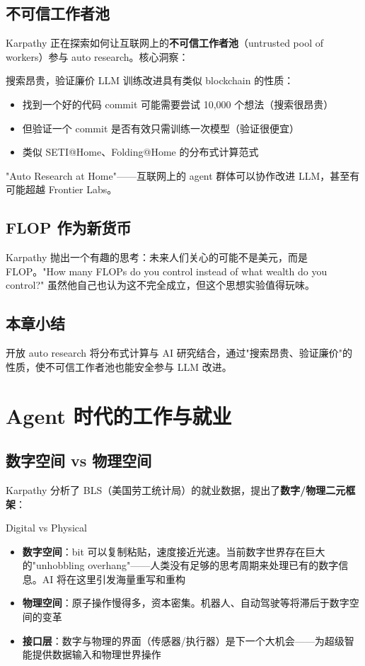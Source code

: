 \documentclass[a4paper]{article}
\begin{document}
\subsection{不可信工作者池}

Karpathy 正在探索如何让互联网上的\textbf{不可信工作者池}（untrusted pool of workers）参与 auto research。核心洞察：

\begin{importantbox}{搜索昂贵，验证廉价}
LLM 训练改进具有类似 blockchain 的性质：
\begin{itemize}
    \item 找到一个好的代码 commit 可能需要尝试 10,000 个想法（搜索很昂贵）
    \item 但验证一个 commit 是否有效只需训练一次模型（验证很便宜）
    \item 类似 SETI@Home、Folding@Home 的分布式计算范式
\end{itemize}
"Auto Research at Home"——互联网上的 agent 群体可以协作改进 LLM，甚至有可能超越 Frontier Labs。
\end{importantbox}

\subsection{FLOP 作为新货币}

Karpathy 抛出一个有趣的思考：未来人们关心的可能不是美元，而是 FLOP。"How many FLOPs do you control instead of what wealth do you control?" 虽然他自己也认为这不完全成立，但这个思想实验值得玩味。

\subsection{本章小结}

开放 auto research 将分布式计算与 AI 研究结合，通过"搜索昂贵、验证廉价"的性质，使不可信工作者池也能安全参与 LLM 改进。


\section{Agent 时代的工作与就业}

\subsection{数字空间 vs 物理空间}

Karpathy 分析了 BLS（美国劳工统计局）的就业数据，提出了\textbf{数字/物理二元框架}：

\begin{importantbox}{Digital vs Physical}
\begin{itemize}
    \item \textbf{数字空间}：bit 可以复制粘贴，速度接近光速。当前数字世界存在巨大的"unhobbling overhang"——人类没有足够的思考周期来处理已有的数字信息。AI 将在这里引发海量重写和重构
    \item \textbf{物理空间}：原子操作慢得多，资本密集。机器人、自动驾驶等将滞后于数字空间的变革
    \item \textbf{接口层}：数字与物理的界面（传感器/执行器）是下一个大机会——为超级智能提供数据输入和物理世界操作
\end{itemize}
\end{importantbox}
\end{document}
